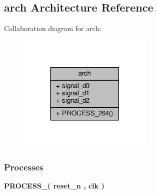 \subsection{arch Architecture Reference}
\label{classbus__synch_1_1arch}


Collaboration diagram for arch\+:\nopagebreak
\begin{figure}[H]
\begin{center}
\leavevmode
\includegraphics[width=182pt]{d8/dae/classbus__synch_1_1arch__coll__graph}
\end{center}
\end{figure}
\subsubsection*{Processes}
 \begin{DoxyCompactItemize}
\item 
{\bf P\+R\+O\+C\+E\+S\+S\+\_}{\bfseries  ( {\bfseries {\bfseries {\bf reset\+\_\+n}} \textcolor{vhdlchar}{ }} , {\bfseries {\bfseries {\bf clk}} \textcolor{vhdlchar}{ }} )}
\end{DoxyCompactItemize}
